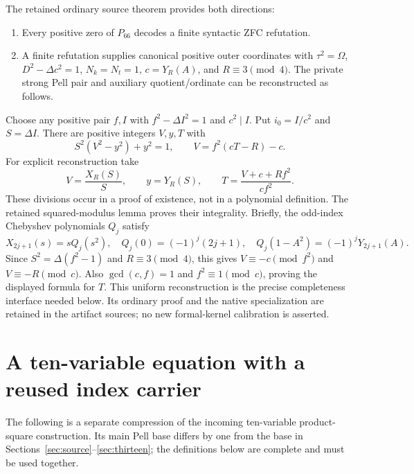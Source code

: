 \documentclass[11pt,letterpaper]{article}
\theoremstyle{remark}\newtheorem{remark}[theorem]{Remark}
\begin{document}
The retained ordinary source theorem provides both directions:
\begin{enumerate}
\item Every positive zero of $P_{66}$ decodes a finite syntactic ZFC refutation.
\item A finite refutation supplies canonical positive outer coordinates with
$\tau^2=\Omega$, $D^2-\Delta c^2=1$, $N_k=N_t=1$,
$c=Y_R(A)$, and $R\equiv3\pmod4$. The private strong Pell pair and auxiliary
quotient/ordinate can be reconstructed as follows.
\end{enumerate}
Choose any positive pair $f,I$ with $f^2-\Delta I^2=1$ and $c^2\mid I$.
Put $i_0=I/c^2$ and $S=\Delta I$. There are positive integers $V,y,T$ with
\begin{equation}\label{eq:aux-source}
S^2(V^2-y^2)+y^2=1,\qquad V=f^2(cT-R)-c.
\end{equation}
For explicit reconstruction take
\[
V=\frac{X_R(S)}S,\qquad y=Y_R(S),\qquad
T=\frac{V+c+Rf^2}{cf^2}.
\]
These divisions occur in a proof of existence, not in a polynomial definition.
The retained squared-modulus lemma proves their integrality. Briefly, the
odd-index Chebyshev polynomials $Q_j$ satisfy
\[
X_{2j+1}(s)=sQ_j(s^2),\quad Q_j(0)=(-1)^j(2j+1),\quad
Q_j(1-A^2)=(-1)^jY_{2j+1}(A).
\]
Since $S^2=\Delta(f^2-1)$ and $R\equiv3\pmod4$, this gives
$V\equiv-c\pmod{f^2}$ and $V\equiv-R\pmod c$.
Also $\gcd(c,f)=1$ and $f^2\equiv1\pmod c$, proving the displayed formula
for $T$. This uniform reconstruction is the precise completeness interface
needed below. Its ordinary proof and the native specialization are retained
in the artifact sources; no new formal-kernel calibration is asserted.





\section{A ten-variable equation with a reused index carrier}
\label{sec:ten}

The following is a separate compression of the incoming ten-variable
product-square construction. Its main Pell base differs by one from the
base in Sections~\ref{sec:source}--\ref{sec:thirteen}; the definitions below
are complete and must be used together.
\end{document}
